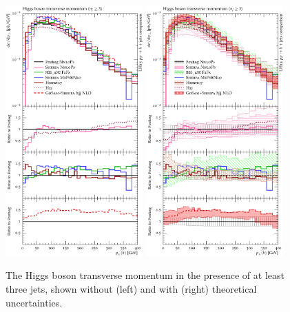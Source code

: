 \begin{figure}[t!]
  \centering
  \includegraphics[width=0.47\textwidth]{figures/hjetscomp_u_H_jjj_pT_incl.pdf}
  \hfill
  \includegraphics[width=0.47\textwidth]{figures/hjetscomp_H_jjj_pT_incl.pdf}
  \caption{
    The Higgs boson transverse momentum in the presence of at least three 
    jets, shown without (left) and with (right) theoretical uncertainties.
    \label{fig:higgscomp:results:mobs:hpt_j3}
  }
\end{figure}

